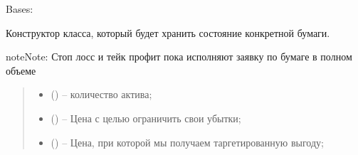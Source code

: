 \documentclass[letterpaper,10pt,english,openany,oneside]{sphinxmanual}
\begin{document}

\begin{fulllineitems}
\label{\detokenize{src.structures:src.structures.st_securities.SecurityState}}
\pysigstartsignatures
{}
\pysigstopsignatures
\sphinxAtStartPar
Bases: 

\begin{fulllineitems}
\label{\detokenize{src.structures:src.structures.st_securities.SecurityState.__init__}}
\pysigstartsignatures
{}
\pysigstopsignatures
\sphinxAtStartPar
Конструктор класса, который будет хранить состояние конкретной бумаги.

\begin{sphinxadmonition}{note}{Note:}
\sphinxAtStartPar
Стоп лосс и тейк профит пока исполняют заявку по бумаге в полном объеме
\end{sphinxadmonition}
\begin{quote}\begin{description}
\begin{itemize}
\item {} 
\sphinxAtStartPar
{} () – количество актива;

\item {} 
\sphinxAtStartPar
{} (\sphinxstyleliteralemphasis{\sphinxupquote{{[}}}\sphinxstyleliteralemphasis{\sphinxupquote{{]}}}) – Цена с целью ограничить свои убытки;

\item {} 
\sphinxAtStartPar
{} (\sphinxstyleliteralemphasis{\sphinxupquote{{[}}}\sphinxstyleliteralemphasis{\sphinxupquote{{]}}}) – Цена, при которой мы получаем таргетированную выгоду;


\end{itemize}
\end{description}
\end{quote}
\end{fulllineitems}
\end{fulllineitems}
\end{document}
